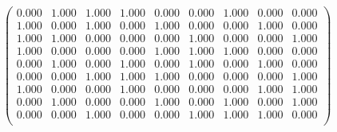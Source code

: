 \documentclass[border=1em]{standalone}
\begin{document}
$
\left(
\begin{array}{ccccccccc}
0.000 & 1.000 & 1.000 & 1.000 & 0.000 & 0.000 & 1.000 & 0.000 & 0.000 \\
1.000 & 0.000 & 1.000 & 0.000 & 1.000 & 0.000 & 0.000 & 1.000 & 0.000 \\
1.000 & 1.000 & 0.000 & 0.000 & 0.000 & 1.000 & 0.000 & 0.000 & 1.000 \\
1.000 & 0.000 & 0.000 & 0.000 & 1.000 & 1.000 & 1.000 & 0.000 & 0.000 \\
0.000 & 1.000 & 0.000 & 1.000 & 0.000 & 1.000 & 0.000 & 1.000 & 0.000 \\
0.000 & 0.000 & 1.000 & 1.000 & 1.000 & 0.000 & 0.000 & 0.000 & 1.000 \\
1.000 & 0.000 & 0.000 & 1.000 & 0.000 & 0.000 & 0.000 & 1.000 & 1.000 \\
0.000 & 1.000 & 0.000 & 0.000 & 1.000 & 0.000 & 1.000 & 0.000 & 1.000 \\
0.000 & 0.000 & 1.000 & 0.000 & 0.000 & 1.000 & 1.000 & 1.000 & 0.000 \\
\end{array}
\right)
$
\end{document}
